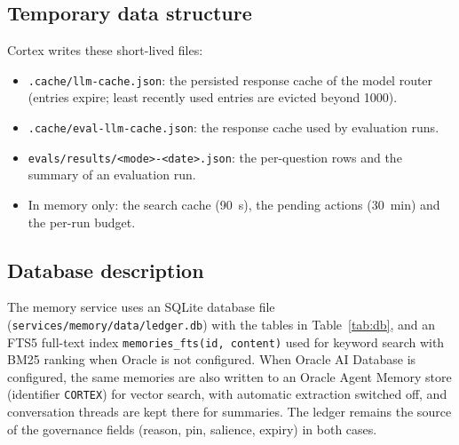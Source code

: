\documentclass[oneside,a4paper,12pt]{report}
\begin{document}
\subsection{Temporary data structure}
Cortex writes these short-lived files:
\begin{itemize}
\item \texttt{.cache/llm-cache.json}: the persisted response cache of the model router (entries expire; least recently used entries are evicted beyond 1000).
\item \texttt{.cache/eval-llm-cache.json}: the response cache used by evaluation runs.
\item \texttt{evals/results/<mode>-<date>.json}: the per-question rows and the summary of an evaluation run.
\item In memory only: the search cache (90~s), the pending actions (30~min) and the per-run budget.
\end{itemize}
\subsection{Database description}
The memory service uses an SQLite database file (\texttt{services/memory/data/ledger.db}) with the tables in Table~\ref{tab:db}, and an FTS5 full-text index \texttt{memories\_fts(id, content)} used for keyword search with BM25 ranking when Oracle is not configured. When Oracle AI Database is configured, the same memories are also written to an Oracle Agent Memory store (identifier \texttt{CORTEX}) for vector search, with automatic extraction switched off, and conversation threads are kept there for summaries. The ledger remains the source of the governance fields (reason, pin, salience, expiry) in both cases.
\end{document}
